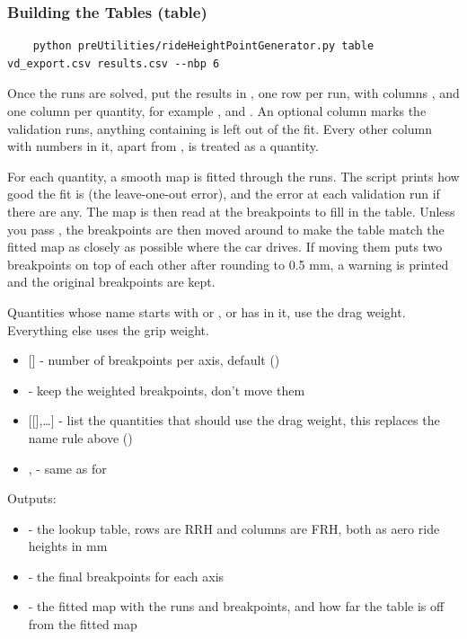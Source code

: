 \subsubsection{Building the Tables (table)}
\begin{lstlisting}
    python preUtilities/rideHeightPointGenerator.py table vd_export.csv results.csv --nbp 6
\end{lstlisting}
Once the runs are solved, put the results in , one row per run, with columns ,  and one column per quantity, for example ,  and . An optional  column marks the validation runs, anything containing  is left out of the fit. Every other column with numbers in it, apart from , is treated as a quantity.

For each quantity, a smooth map is fitted through the runs. The script prints how good the fit is (the leave-one-out error), and the error at each validation run if there are any. The map is then read at the breakpoints to fill in the table. Unless you pass , the breakpoints are then moved around to make the table match the fitted map as closely as possible where the car drives. If moving them puts two breakpoints on top of each other after rounding to 0.5 mm, a warning is printed and the original breakpoints are kept.

Quantities whose name starts with  or , or has  in it, use the drag weight. Everything else uses the grip weight.
\begin{itemize}
    \item {} [] - number of breakpoints per axis, default  ()
    \item {} - keep the weighted breakpoints, don't move them
    \item {} [[],\dots] - list the quantities that should use the drag weight, this replaces the name rule above ()
    \item {},  - same as for 
\end{itemize}
Outputs:
\begin{itemize}
    \item {} - the lookup table, rows are RRH and columns are FRH, both as aero ride heights in mm
    \item {} - the final breakpoints for each axis
    \item {} - the fitted map with the runs and breakpoints, and how far the table is off from the fitted map
\end{itemize}

